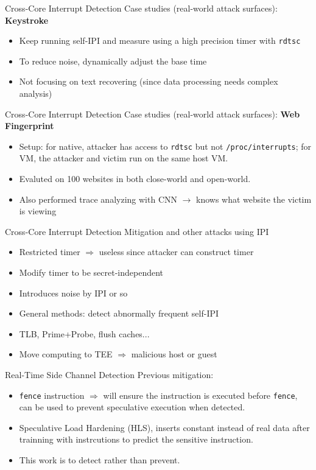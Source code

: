 \documentclass{beamer}
\begin{document}
\begin{frame}{Cross-Core Interrupt Detection\cite{cross-core}}
  Case studies (real-world attack surfaces): \textbf{Keystroke}
\begin{itemize}[<+->]
  \item Keep running self-IPI and measure using a high precision timer with \texttt{rdtsc}
  \item To reduce noise, dynamically adjust the base time
  \item Not focusing on text recovering (since data processing needs complex analysis)
\end{itemize}
\end{frame}

\begin{frame}{Cross-Core Interrupt Detection\cite{cross-core}}
  Case studies (real-world attack surfaces): \textbf{Web Fingerprint}
\begin{itemize}[<+->]
  \item Setup: for native, attacker has access to \texttt{rdtsc} but not \texttt{/proc/interrupts}; for VM, the attacker and victim run on the same host VM.
  \item Evaluted on 100 websites in both close-world and open-world.
  \item Also performed trace analyzing with CNN $\rightarrow$ knows what website the victim is viewing
\end{itemize}
\end{frame}

\begin{frame}{Cross-Core Interrupt Detection\cite{cross-core}}
Mitigation and other attacks using IPI
\begin{itemize}[<+->]
  \item Restricted timer $\Rightarrow$ useless since attacker can construct timer
  \item Modify timer to be secret-independent
  \item Introduces noise by IPI or so
  \item General methods: detect abnormally frequent self-IPI
  \item TLB, Prime+Probe, flush caches...
  \item Move computing to TEE $\Rightarrow$ malicious host or guest
\end{itemize}
\end{frame}

\begin{frame}{Real-Time Side Channel Detection\cite{le-2021}}
Previous mitigation:
\begin{itemize}[<+->]
    \item \texttt{fence} instruction $\Rightarrow$ will ensure the instruction is executed before \texttt{fence}, can be used to prevent speculative execution when detected.
    \item Speculative Load Hardening (HLS), inserts constant instead of real data after trainning with instrcutions to predict the sensitive instruction.
    \item This work is to detect rather than prevent.
\end{itemize}
\end{frame}
\end{document}

